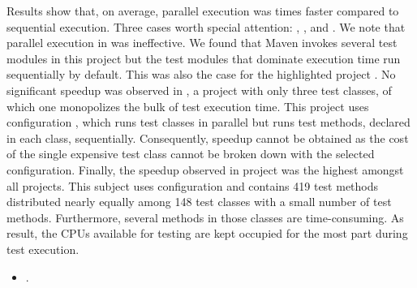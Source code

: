 Results show that, on average, parallel execution was
\avgSpeedup{} times faster compared to sequential execution.
Three cases worth special attention: , ,
and .
We note that parallel execution in  was
ineffective.  We found that Maven invokes several test modules in this
project but the test modules that dominate execution time run
sequentially by default. This was also the case for the highlighted
project .
No significant speedup was observed in , a project with
only three test classes, of which one monopolizes the bulk of test
execution time.
This project uses configuration \ParClassSeqMeth{}, which runs test
classes in parallel but runs test methods, declared in each class,
sequentially.
Consequently, speedup cannot be obtained as the cost of the single
expensive test class cannot be broken down with the selected
configuration.
Finally, the speedup observed in project  was
the highest amongst all projects. This subject uses configuration
\ParClassParMeth{} and contains 419 test methods distributed nearly
equally among 148 test classes with a small number of test methods.
Furthermore, several methods in those classes are time-consuming.
As result, the CPUs available for testing are kept occupied for the
most part during test execution.

\begin{center}
\end{center}

\begin{itemize}
    \item \numRQSpeedupTwo{}. \textbf{\RQSpeedupTwo}
\end{itemize}

\newcommand{\subjectScalability}{MapDB}

